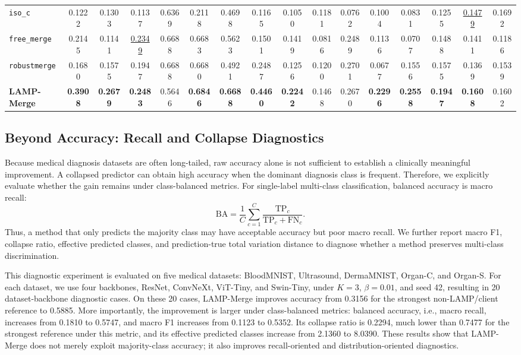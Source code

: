 \begin{table}[t]
\begin{tabular}{lccccccccccccccc}
\texttt{iso\_c} & 0.1222 & 0.1303 & 0.1137 & 0.6369 & 0.2118 & 0.4698 & 0.1165 & 0.1050 & 0.1181 & 0.0762 & 0.1004 & 0.0831 & 0.1255 & \underline{0.1479} & 0.1692 \\
\texttt{free\_merge} & 0.2145 & 0.1141 & \underline{0.2349} & 0.6688 & 0.6683 & 0.5623 & 0.1501 & 0.1419 & 0.0816 & 0.2489 & 0.1136 & 0.0707 & 0.1488 & 0.1411 & 0.1186 \\
\texttt{robustmerge} & 0.1680 & 0.1575 & 0.1947 & 0.6688 & 0.6680 & 0.4921 & 0.2487 & 0.1256 & 0.1200 & 0.2701 & 0.0677 & 0.1556 & 0.1575 & 0.1369 & 0.1539 \\
\textbf{LAMP-Merge} & \textbf{0.3908} & \textbf{0.2679} & \textbf{0.2483} & 0.5646 & \textbf{0.6846} & \textbf{0.6688} & \textbf{0.4460} & \textbf{0.2242} & 0.1468 & 0.2670 & \textbf{0.2296} & \textbf{0.2558} & \textbf{0.1947} & \textbf{0.1608} & 0.1602 \\
\bottomrule
\end{tabular}
\end{table}

\subsection{Beyond Accuracy: Recall and Collapse Diagnostics}

Because medical diagnosis datasets are often long-tailed, raw accuracy alone is not sufficient to establish a clinically meaningful improvement. A collapsed predictor can obtain high accuracy when the dominant diagnosis class is frequent. Therefore, we explicitly evaluate whether the gain remains under class-balanced metrics. For single-label multi-class classification, balanced accuracy is macro recall:
\[
\mathrm{BA}=\frac{1}{C}\sum_{c=1}^{C}\frac{\mathrm{TP}_c}{\mathrm{TP}_c+\mathrm{FN}_c}.
\]
Thus, a method that only predicts the majority class may have acceptable accuracy but poor macro recall. We further report macro F1, collapse ratio, effective predicted classes, and prediction-true total variation distance to diagnose whether a method preserves multi-class discrimination.

This diagnostic experiment is evaluated on five medical datasets: BloodMNIST, Ultrasound, DermaMNIST, Organ-C, and Organ-S. For each dataset, we use four backbones, ResNet, ConvNeXt, ViT-Tiny, and Swin-Tiny, under $K=3$, $\beta=0.01$, and seed 42, resulting in 20 dataset-backbone diagnostic cases. On these 20 cases, LAMP-Merge improves accuracy from 0.3156 for the strongest non-LAMP/client reference to 0.5885. More importantly, the improvement is larger under class-balanced metrics: balanced accuracy, i.e., macro recall, increases from 0.1810 to 0.5747, and macro F1 increases from 0.1123 to 0.5352. Its collapse ratio is 0.2294, much lower than 0.7477 for the strongest reference under this metric, and its effective predicted classes increase from 2.1360 to 8.0390. These results show that LAMP-Merge does not merely exploit majority-class accuracy; it also improves recall-oriented and distribution-oriented diagnostics.

